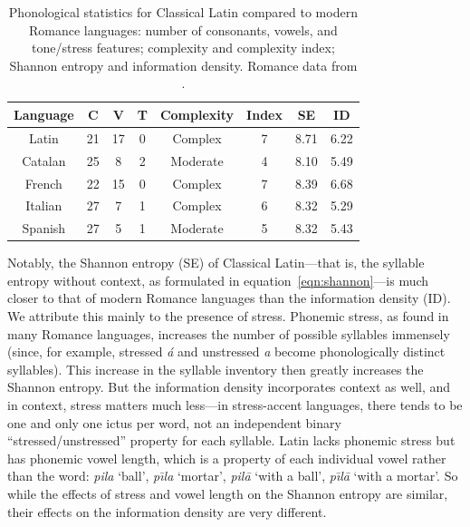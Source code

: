 \documentclass[12pt,twoside]{article}
\begin{document}
\begin{table}[h]
\centering
\caption{Phonological statistics for Classical Latin compared to modern Romance languages: number of consonants, vowels, and tone/stress features; complexity and complexity index; Shannon entropy and information density. Romance data from \cite[44-45]{oh}.}
\label{tab:phono}

\vspace{2ex}

\begin{tabular}{|c|c|c|c|c|c|c|c|}
\hline
\textbf{Language} & \textbf{C} & \textbf{V} & \textbf{T} & \textbf{Complexity} & \textbf{Index} & \textbf{SE} & \textbf{ID} \\\hline
Latin & 21 & 17 & 0 & Complex & 7 & 8.71 & 6.22 \\\hline
Catalan & 25 & 8 & 2 & Moderate & 4 & 8.10 & 5.49 \\\hline
French & 22 & 15 & 0 & Complex & 7 & 8.39 & 6.68 \\\hline
Italian & 27 & 7 & 1 & Complex & 6 & 8.32 & 5.29 \\\hline
Spanish & 27 & 5 & 1 & Moderate & 5 & 8.32 & 5.43 \\\hline
\end{tabular}
\end{table}

Notably, the Shannon entropy (SE) of Classical Latin---that is, the syllable entropy without context, as formulated in equation~\ref{eqn:shannon}---is much closer to that of modern Romance languages than the information density (ID). We attribute this mainly to the presence of stress. Phonemic stress, as found in many Romance languages, increases the number of possible syllables immensely (since, for example, stressed \emph{\'a} and unstressed \emph{a} become phonologically distinct syllables). This increase in the syllable inventory then greatly increases the Shannon entropy. But the information density incorporates context as well, and in context, stress matters much less---in stress-accent languages, there tends to be one and only one ictus per word, not an independent binary ``stressed/unstressed'' property for each syllable. Latin lacks phonemic stress but has phonemic vowel length, which is a property of each individual vowel rather than the word: \emph{pila} `ball', \emph{p\=\i{}la} `mortar', \emph{pil\=a} `with a ball', \emph{p\=\i{}l\=a} `with a mortar'. So while the effects of stress and vowel length on the Shannon entropy are similar, their effects on the information density are very different.
\end{document}

